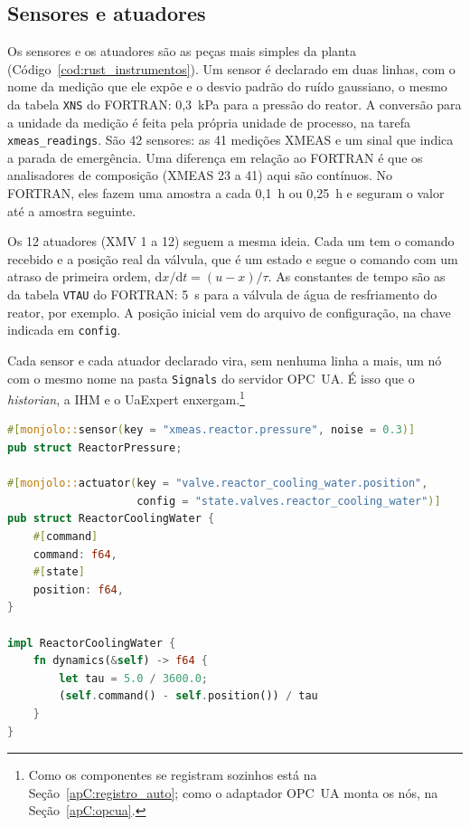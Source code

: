 \subsection{Sensores e atuadores}
\label{subsec:sensores_atuadores}

Os sensores e os atuadores são as peças mais simples da planta (Código~\ref{cod:rust_instrumentos}). Um sensor é declarado em duas linhas, com o nome da medição que ele expõe e o desvio padrão do ruído gaussiano, o mesmo da tabela \texttt{XNS} do FORTRAN: 0,3~kPa para a pressão do reator. A conversão para a unidade da medição é feita pela própria unidade de processo, na tarefa \texttt{xmeas\_readings}. São 42 sensores: as 41 medições XMEAS e um sinal que indica a parada de emergência. Uma diferença em relação ao FORTRAN é que os analisadores de composição (XMEAS 23 a 41) aqui são contínuos. No FORTRAN, eles fazem uma amostra a cada 0,1~h ou 0,25~h e seguram o valor até a amostra seguinte.

Os 12 atuadores (XMV 1 a 12) seguem a mesma ideia. Cada um tem o comando recebido e a posição real da válvula, que é um estado e segue o comando com um atraso de primeira ordem, $\mathrm{d}x/\mathrm{d}t = (u - x)/\tau$. As constantes de tempo são as da tabela \texttt{VTAU} do FORTRAN: 5~s para a válvula de água de resfriamento do reator, por exemplo. A posição inicial vem do arquivo de configuração, na chave indicada em \texttt{config}.

Cada sensor e cada atuador declarado vira, sem nenhuma linha a mais, um nó com o mesmo nome na pasta \texttt{Signals} do servidor OPC~UA. É isso que o \textit{historian}, a IHM e o UaExpert enxergam.\footnote{Como os componentes se registram sozinhos está na Seção~\ref{apC:registro_auto}; como o adaptador OPC~UA monta os nós, na Seção~\ref{apC:opcua}.}

\noindent\begin{minipage}{\linewidth}
\begin{lstlisting}[language=Rust, caption={Um sensor e um atuador no \texttt{tep-plant}}, label={cod:rust_instrumentos}]
#[monjolo::sensor(key = "xmeas.reactor.pressure", noise = 0.3)]
pub struct ReactorPressure;

#[monjolo::actuator(key = "valve.reactor_cooling_water.position",
                    config = "state.valves.reactor_cooling_water")]
pub struct ReactorCoolingWater {
    #[command]
    command: f64,
    #[state]
    position: f64,
}

impl ReactorCoolingWater {
    fn dynamics(&self) -> f64 {
        let tau = 5.0 / 3600.0;
        (self.command() - self.position()) / tau
    }
}
\end{lstlisting}
\end{minipage}

